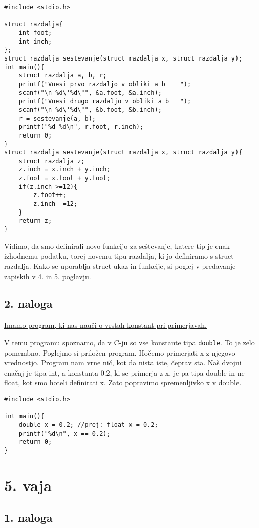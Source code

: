 \documentclass[a4paper, 12pt]{article}
\begin{document}
\begin{lstlisting}
#include <stdio.h>

struct razdalja{
	int foot;
	int inch;
};
struct razdalja sestevanje(struct razdalja x, struct razdalja y);
int main(){
	struct razdalja a, b, r;
	printf("Vnesi prvo razdaljo v obliki a b	");
	scanf("\n %d\'%d\"", &a.foot, &a.inch);
	printf("Vnesi drugo razdaljo v obliki a b	");
	scanf("\n %d\'%d\"", &b.foot, &b.inch);
	r = sestevanje(a, b);
	printf("%d %d\n", r.foot, r.inch);
	return 0;
}	
struct razdalja sestevanje(struct razdalja x, struct razdalja y){
	struct razdalja z;
	z.inch = x.inch + y.inch;
	z.foot = x.foot + y.foot;
	if(z.inch >=12){
		z.foot++;
		z.inch -=12;
	}
	return z;
}
\end{lstlisting}
Vidimo, da smo definirali novo funkcijo za seštevanje, katere tip je enak izhodnemu podatku, torej novemu tipu razdalja, ki jo definiramo s struct razdalja. Kako se uporablja struct ukaz in funkcije, si poglej v predavanje zapiskih v 4. in 5. poglavju.
\pagebreak
\subsection*{2. naloga}
\underline{Imamo program, ki nas nauči o vrstah konstant pri primerjavah.}\

V temu programu spoznamo, da v C-ju so vse konstante tipa \lstinline|double|. To je zelo pomembno. Poglejmo si priložen program. Hočemo primerjati x z njegovo vrednostjo. Program nam vrne nič, kot da nista iste, čeprav sta. Naš dvojni enačaj je tipa int, a konstanta 0.2, ki se primerja z x, je pa tipa double in ne float, kot smo hoteli definirati x. Zato popravimo spremenljivko x v double.	
	
\begin{lstlisting}
#include <stdio.h>

int main(){
	double x = 0.2; //prej: float x = 0.2;
	printf("%d\n", x == 0.2);
	return 0;
}
\end{lstlisting}

\section*{5. vaja}
\subsection*{1. naloga}
\end{document}
